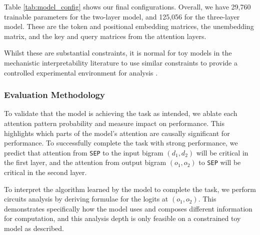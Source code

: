 Table \ref{tab:model_config} shows our final configurations.
Overall, we have 29,760 trainable parameters for the two-layer model, and 125,056 for the three-layer model.
These are the token and positional embedding matrices, the unembedding matrix, and the key and query matrices from the attention layers. 

Whilst these are substantial constraints, it is normal for toy models in the mechanistic interpretability literature to use similar constraints to provide a controlled experimental environment for analysis \citep{nanda2023progress, elhage2021mathematical}.

\subsubsection{Evaluation Methodology}

To validate that the model is achieving the task as intended, we ablate each attention pattern probability and measure impact on performance. This highlights which parts of the model's attention are causally significant for performance.
To successfully complete the task with strong performance, we predict that attention from \texttt{SEP} to the input bigram $(d_1, d_2)$ will be critical in the first layer, and the attention from output bigram $(o_1, o_2)$ to \texttt{SEP} will be critical in the second layer.

To interpret the algorithm learned by the model to complete the task, we perform circuits analysis \cite{ameisen2025circuit} by deriving formulae for the logits at $(o_1, o_2)$.
This demonstrates specifically how the model uses and composes different information for computation, and this analysis depth is only feasible on a constrained toy model as described.
